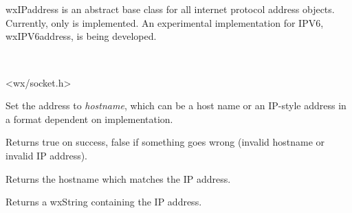 \section{}\label{wxipaddress}

wxIPaddress is an abstract base class for all internet protocol address 
objects. Currently, only  
is implemented. An experimental implementation for IPV6, wxIPV6address,
is being developed.


\\


<wx/socket.h>


%
%

\label{wxipaddresshostname}


Set the address to {\it hostname}, which can be a host name
or an IP-style address in a format dependent on implementation.


Returns true on success, false if something goes wrong
(invalid hostname or invalid IP address).


Returns the hostname which matches the IP address.

%
%

\label{wxipaddressipaddress}


Returns a wxString containing the IP address.

%
%

\label{wxipaddressservice}

